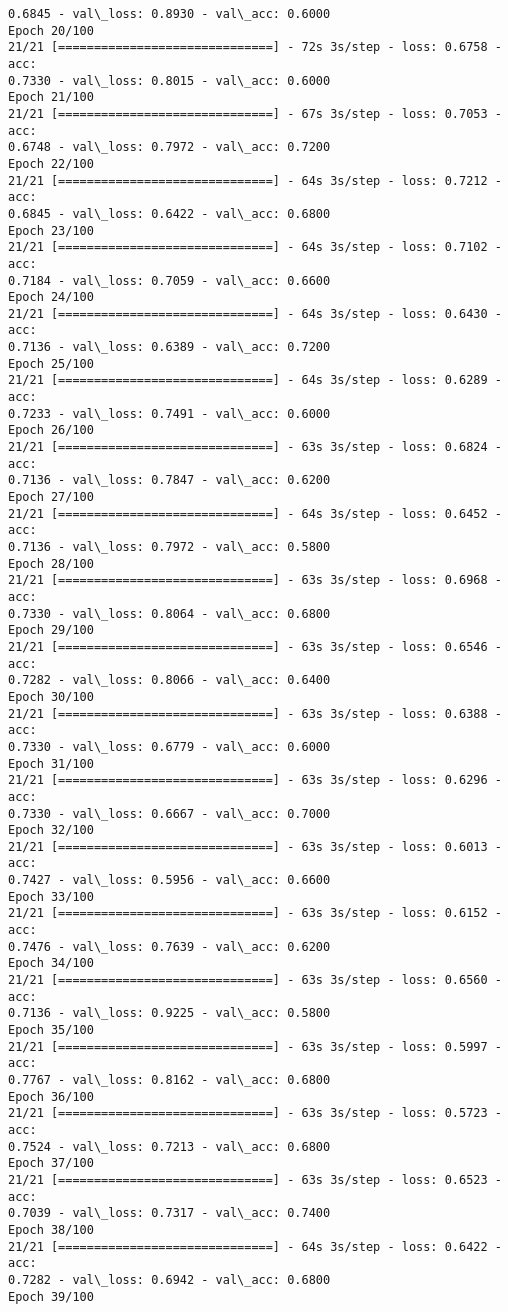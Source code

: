 \documentclass[11pt]{article}
\begin{document}
\begin{Verbatim}[commandchars=\\\{\}]
0.6845 - val\_loss: 0.8930 - val\_acc: 0.6000
Epoch 20/100
21/21 [==============================] - 72s 3s/step - loss: 0.6758 - acc:
0.7330 - val\_loss: 0.8015 - val\_acc: 0.6000
Epoch 21/100
21/21 [==============================] - 67s 3s/step - loss: 0.7053 - acc:
0.6748 - val\_loss: 0.7972 - val\_acc: 0.7200
Epoch 22/100
21/21 [==============================] - 64s 3s/step - loss: 0.7212 - acc:
0.6845 - val\_loss: 0.6422 - val\_acc: 0.6800
Epoch 23/100
21/21 [==============================] - 64s 3s/step - loss: 0.7102 - acc:
0.7184 - val\_loss: 0.7059 - val\_acc: 0.6600
Epoch 24/100
21/21 [==============================] - 64s 3s/step - loss: 0.6430 - acc:
0.7136 - val\_loss: 0.6389 - val\_acc: 0.7200
Epoch 25/100
21/21 [==============================] - 64s 3s/step - loss: 0.6289 - acc:
0.7233 - val\_loss: 0.7491 - val\_acc: 0.6000
Epoch 26/100
21/21 [==============================] - 63s 3s/step - loss: 0.6824 - acc:
0.7136 - val\_loss: 0.7847 - val\_acc: 0.6200
Epoch 27/100
21/21 [==============================] - 64s 3s/step - loss: 0.6452 - acc:
0.7136 - val\_loss: 0.7972 - val\_acc: 0.5800
Epoch 28/100
21/21 [==============================] - 63s 3s/step - loss: 0.6968 - acc:
0.7330 - val\_loss: 0.8064 - val\_acc: 0.6800
Epoch 29/100
21/21 [==============================] - 63s 3s/step - loss: 0.6546 - acc:
0.7282 - val\_loss: 0.8066 - val\_acc: 0.6400
Epoch 30/100
21/21 [==============================] - 63s 3s/step - loss: 0.6388 - acc:
0.7330 - val\_loss: 0.6779 - val\_acc: 0.6000
Epoch 31/100
21/21 [==============================] - 63s 3s/step - loss: 0.6296 - acc:
0.7330 - val\_loss: 0.6667 - val\_acc: 0.7000
Epoch 32/100
21/21 [==============================] - 63s 3s/step - loss: 0.6013 - acc:
0.7427 - val\_loss: 0.5956 - val\_acc: 0.6600
Epoch 33/100
21/21 [==============================] - 63s 3s/step - loss: 0.6152 - acc:
0.7476 - val\_loss: 0.7639 - val\_acc: 0.6200
Epoch 34/100
21/21 [==============================] - 63s 3s/step - loss: 0.6560 - acc:
0.7136 - val\_loss: 0.9225 - val\_acc: 0.5800
Epoch 35/100
21/21 [==============================] - 63s 3s/step - loss: 0.5997 - acc:
0.7767 - val\_loss: 0.8162 - val\_acc: 0.6800
Epoch 36/100
21/21 [==============================] - 63s 3s/step - loss: 0.5723 - acc:
0.7524 - val\_loss: 0.7213 - val\_acc: 0.6800
Epoch 37/100
21/21 [==============================] - 63s 3s/step - loss: 0.6523 - acc:
0.7039 - val\_loss: 0.7317 - val\_acc: 0.7400
Epoch 38/100
21/21 [==============================] - 64s 3s/step - loss: 0.6422 - acc:
0.7282 - val\_loss: 0.6942 - val\_acc: 0.6800
Epoch 39/100

\end{Verbatim}
\end{document}
